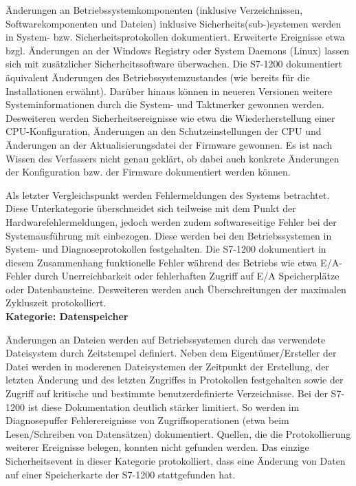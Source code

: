 Änderungen an Betriebssystemkomponenten (inklusive Verzeichnissen, Softwarekomponenten und Dateien) inklusive Sicherheits(sub-)systemen werden in System- bzw. Sicherheitsprotokollen dokumentiert. Erweiterte Ereignisse etwa bzgl. Änderungen an der Windows Registry oder System Daemons (Linux) lassen sich mit zusätzlicher Sicherheitssoftware überwachen. Die S7-1200 dokumentiert äquivalent Änderungen des Betriebssystemzustandes (wie bereits für die Installationen erwähnt). Darüber hinaus können in neueren Versionen weitere Systeminformationen durch die System- und Taktmerker gewonnen werden. Desweiteren werden Sicherheitsereignisse wie etwa die Wiederherstellung einer CPU-Konfiguration, Änderungen an den Schutzeinstellungen der CPU und Änderungen an der Aktualisierungsdatei der Firmware gewonnen. Es ist nach Wissen des Verfassers nicht genau geklärt, ob dabei auch konkrete Änderungen der Konfiguration bzw. der Firmware dokumentiert werden können.

Als letzter Vergleichspunkt werden Fehlermeldungen des Systems betrachtet. Diese Unterkategorie überschneidet sich teilweise mit dem Punkt der Hardwarefehlermeldungen, jedoch werden zudem softwareseitige Fehler bei der Systemausführung mit einbezogen. Diese werden bei den Betriebssystemen in System- und Diagnoseprotokollen festgehalten. Die S7-1200 dokumentiert in diesem Zusammenhang funktionelle Fehler während des Betriebs wie etwa E/A-Fehler durch Unerreichbarkeit oder fehlerhaften Zugriff auf E/A Speicherplätze oder Datenbausteine. Desweiteren werden auch Überschreitungen der maximalen Zykluszeit protokolliert.\\

\textbf{Kategorie: Datenspeicher}

Änderungen an Dateien werden auf Betriebssystemen durch das verwendete Dateisystem durch Zeitstempel definiert. Neben dem Eigentümer/Ersteller der Datei werden in moderenen Dateisystemen der Zeitpunkt der Erstellung, der letzten Änderung und des letzten Zugriffes in Protokollen festgehalten sowie der Zugriff auf kritische und bestimmte benutzerdefinierte Verzeichnisse. Bei der S7-1200 ist diese Dokumentation deutlich stärker limitiert. So werden im Diagnosepuffer Fehlerereignisse von Zugriffsoperationen (etwa beim Lesen/Schreiben von Datensätzen) dokumentiert. Quellen, die die Protokollierung weiterer Ereignisse belegen, konnten nicht gefunden werden. Das einzige Sicherheitsevent in dieser Kategorie protokolliert, dass eine Änderung von Daten auf einer Speicherkarte der S7-1200 stattgefunden hat.\\

